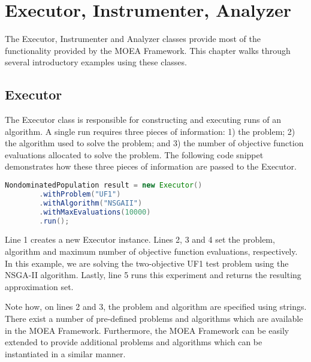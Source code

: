 %
%

\chapter{Executor, Instrumenter, Analyzer}
\label{chpt:executor}

The Executor, Instrumenter and Analyzer classes provide most of the functionality provided by the MOEA Framework.  This chapter walks through several introductory examples using these classes.

\section{Executor}
The Executor class is responsible for constructing and executing runs of an algorithm.  A single run requires three pieces of information: 1) the problem; 2) the algorithm used to solve the problem; and 3) the number of objective function evaluations allocated to solve the problem.  The following code snippet demonstrates how these three pieces of information are passed to the Executor.

\begin{lstlisting}[language=Java]
NondominatedPopulation result = new Executor()
		.withProblem("UF1")
		.withAlgorithm("NSGAII")
		.withMaxEvaluations(10000)
		.run();
\end{lstlisting}

Line 1 creates a new Executor instance.  Lines 2, 3 and 4 set the problem, algorithm and maximum number of objective function evaluations, respectively.  In this example, we are solving the two-objective UF1 test problem using the NSGA-II algorithm.  Lastly, line 5 runs this experiment and returns the resulting approximation set.

Note how, on lines 2 and 3, the problem and algorithm are specified using strings.  There exist a number of pre-defined problems and algorithms which are available in the MOEA Framework.  Furthermore, the MOEA Framework can be easily extended to provide additional problems and algorithms which can be instantiated in a similar manner.

